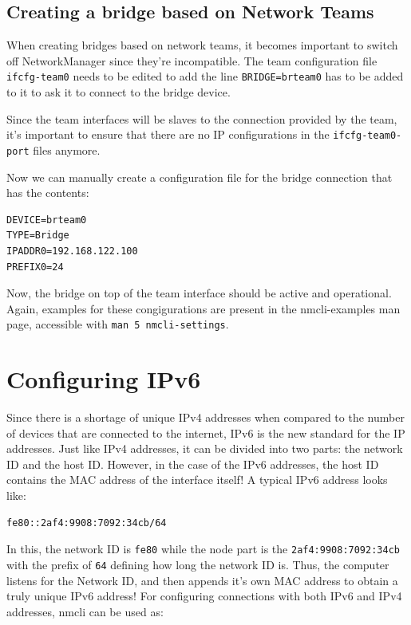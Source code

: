 \subsection{Creating a bridge based on Network Teams}
When creating bridges based on network teams, it becomes important to switch off NetworkManager since they're incompatible. The team configuration file \verb|ifcfg-team0| needs to be edited to add the line \verb|BRIDGE=brteam0| has to be added to it to ask it to connect to the bridge device. 

Since the team interfaces will be slaves to the connection provided by the team, it's important to ensure that there are no IP configurations in the \verb|ifcfg-team0-port| files anymore.

Now we can manually create a configuration file for the bridge connection that has the contents:

\vspace{-15pt}
\begin{verbatim}
DEVICE=brteam0
TYPE=Bridge
IPADDR0=192.168.122.100
PREFIX0=24
\end{verbatim}
\vspace{-10pt}	

\noindent
Now, the bridge on top of the team interface should be active and operational. Again, examples for these congigurations are present in the nmcli-examples man page, accessible with \verb|man 5 nmcli-settings|. 

\section{Configuring IPv6} 
Since there is a shortage of unique IPv4 addresses when compared to the number of devices that are connected to the internet, IPv6 is the new standard for the IP addresses. Just like IPv4 addresses, it can be divided into two parts: the network ID and the host ID. However, in the case of the IPv6 addresses, the host ID contains the MAC address of the interface itself! A typical IPv6 address looks like:

\vspace{-15pt}
\begin{verbatim}
fe80::2af4:9908:7092:34cb/64
\end{verbatim}
\vspace{-10pt}	

\noindent
In this, the network ID is \verb|fe80| while the node part is the \verb|2af4:9908:7092:34cb| with the prefix of \verb|64| defining how long the network ID is. Thus, the computer listens for the Network ID, and then appends it's own MAC address to obtain a truly unique IPv6 address! For configuring connections with both IPv6 and IPv4 addresses, nmcli can be used as:

